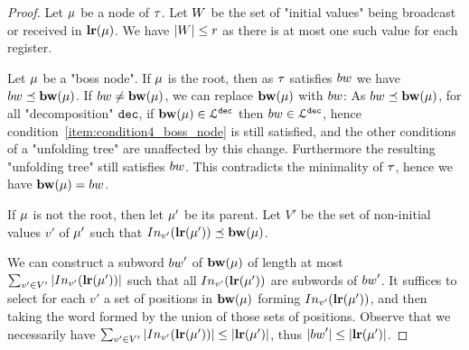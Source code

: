 \begin{proof}
	Let $\mu$ be a node of $\tau$.
	Let $W$ be the set of "initial values" being broadcast or received in $\mathbf{lr}(\mu)$. We have $|W|\leq r$ as there is at most one such value for each register.  
	
%	
	
	Let $\mu$ be a "boss node". If $\mu$ is the root, then as $\tau$ satisfies $\bossspec$ we have $\bossspec \subword \bosslabel{\node}$. If $\bossspec \neq \bosslabel{\node}$, we can replace $\mathbf{bw}(\mu)$ with $\bossspec$: As $\bossspec \subword \bosslabel{\node}$, for all "decomposition" $\mathtt{dec}$, if $\mathbf{bw}(\mu) \in \mathcal{L}^{\mathtt{\mathtt{dec}}}$ then $\bossspec \in \langdec{\decsymb}$, hence condition~\ref{item:condition4_boss_node} is still satisfied, and the other conditions of a "unfolding tree" are unaffected by this change.
	Furthermore the resulting "unfolding tree" still satisfies $\bossspec$. This contradicts the minimality of $\tau$, hence we have $\bosslabel{\node} = \bossspec$.
	
	If $\mu$ is not the root, then let $\mu'$ be its parent. 
	Let $V'$ be the set of non-initial values $v'$ of $\mu'$ such that $\vinput{v'}{\localrunlabel{\node'}} \subword \bosslabel{\node}$.
	
	We can construct a subword $\bossspec'$ of $\mathbf{bw}(\mu)$ of length at most $\sum_{v' \in V'} \size{\vinput{v'}{\localrunlabel{\node'}}}$ such that all $\vinput{v'}{\localrunlabel{\node'}}$ are subwords of $\bossspec'$. It suffices to select for each $v'$ a set of positions in $\mathbf{bw}(\mu)$ forming $\vinput{v'}{\localrunlabel{\node'}}$, and then taking the word formed by the union of those sets of positions.
	Observe that we necessarily have $\sum_{v' \in V'} \size{\vinput{v'}{\localrunlabel{\node'}}} \leq \size{\localrunlabel{\node'}}$, thus $\size{\bossspec'} \leq \size{\localrunlabel{\node'}}$.
	

\end{proof}
